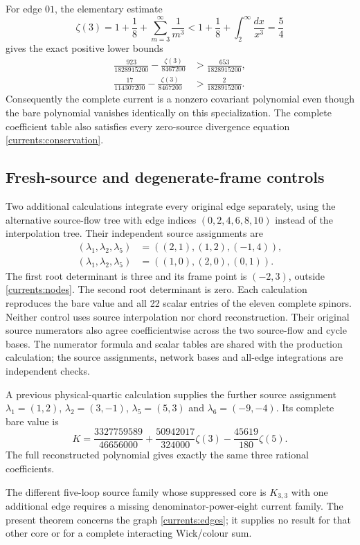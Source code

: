 For edge $01$, the elementary estimate
\begin{equation}
 \zeta(3)=1+\frac18+\sum_{m=3}^{\infty}\frac1{m^3}
 <1+\frac18+\int_2^{\infty}\frac{dx}{x^3}=\frac54
\end{equation}
gives the exact positive lower bounds
\begin{align}
 \frac{923}{1828915200}-\frac{\zeta(3)}{8467200}
 &>\frac{653}{1828915200},\nonumber\\
 \frac{17}{114307200}-\frac{\zeta(3)}{8467200}
 &>\frac{2}{1828915200}.
\end{align}
Consequently the complete current is a nonzero covariant polynomial
even though the bare polynomial vanishes identically on this
specialization. The complete coefficient table also satisfies every
zero-source divergence equation \eqref{currents:conservation}.

\subsection{Fresh-source and degenerate-frame controls}

Two additional calculations integrate every original edge separately,
using the alternative source-flow tree with edge indices
$(0,2,4,6,8,10)$ instead of the interpolation tree.
Their independent source assignments are
\begin{align}
 (\lambda_1,\lambda_2,\lambda_5)&=((2,1),(1,2),(-1,4)),
 \label{currents:fresh}\\
 (\lambda_1,\lambda_2,\lambda_5)&=((1,0),(2,0),(0,1)).
 \label{currents:degenerate}
\end{align}
The first root determinant is three and its frame point is $(-2,3)$,
outside \eqref{currents:nodes}. The second root determinant is zero.
Each calculation reproduces the bare value and all 22 scalar entries
of the eleven complete spinors. Neither control uses source
interpolation nor chord reconstruction. Their original source
numerators also agree coefficientwise across the two source-flow
and cycle bases. The numerator formula and scalar tables are shared
with the production calculation; the source assignments, network
bases and all-edge integrations are independent checks.

A previous physical-quartic calculation supplies the further source
assignment $\lambda_1=(1,2)$, $\lambda_2=(3,-1)$,
$\lambda_5=(5,3)$ and $\lambda_6=(-9,-4)$. Its complete bare value is
\begin{equation}
 K=\frac{3327759589}{46656000}
   +\frac{50942017}{324000}\zeta(3)
   -\frac{45619}{180}\zeta(5).
 \label{currents:physicalvalue}
\end{equation}
The full reconstructed polynomial gives exactly the same three
rational coefficients.

The different five-loop source family whose suppressed core is
$K_{3,3}$ with one additional edge requires a missing denominator-power-eight
current family. The present theorem concerns the graph
\eqref{currents:edges}; it supplies no result for that other core or
for a complete interacting Wick/colour sum.
